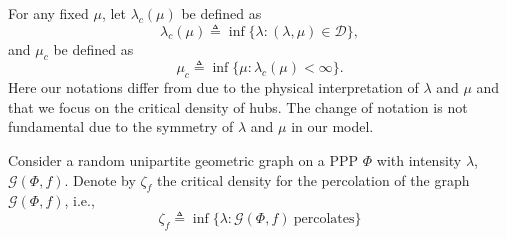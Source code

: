 For any fixed $\mu$, let $\lambda_c(\mu)$ be defined as \[
        \lambda_c(\mu) \triangleq \inf \{\lambda: (\lambda,\mu)\in \mathcal{D}\},\]
and $\mu_c$ be defined as
    \begin{equation}
        \mu_c \triangleq \inf \{\mu: \lambda_c(\mu)<\infty\}.\nonumber
    \end{equation} 
 Here our notations differ from \cite{penrose_2014} due to the physical interpretation of $\lambda$ and $\mu$ and that we focus on the critical density of hubs. The change of notation is not fundamental due to the symmetry of $\lambda$ and $\mu$ in our model.

\begin{comment}
    
    Denote the probability of node $x$ at distance $r=\|x\|$ being connected to $o$ as $g(r)$. 
   \begin{equation}
g(r)= 1-\exp\left(-\mu\int_{\mathbb{R}^2}f(\|y\|)f(\|x-y\|)\dd y\right).
    \end{equation}
    
    The function $g$ abstracts the impact of $\Psi$ and shows the probability of a connection at a given distance to $o$. Assuming independence between different connections, we obtain the Poisson random connection model. For the Poisson random connection model, we denote the percolation threshold as $\lambda_c^*$, defined analogously to Definitions 2 and 3.
 This ignores the underlying \hl{correlation} between connections due to hubs locations in the RBG graph. 

\end{comment}
 Consider a random unipartite geometric graph on a  PPP $\Phi$ with intensity $\lambda$, $\mathcal{G}(\Phi,f)$. 
 Denote by $\zeta_f$ the critical density for the percolation of the graph $\mathcal{G}(\Phi,f)$, i.e.,
 \[
\zeta_f \triangleq \inf \{\lambda\colon \mathcal{G}\left(\Phi,f\right) ~\mathrm{percolates}\}
 \]
 

